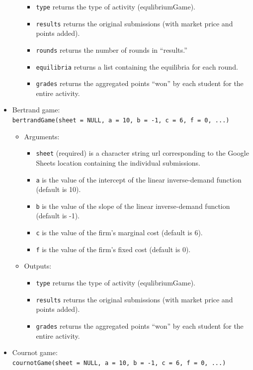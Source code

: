 \documentclass[
]{article}
\providecommand{\tightlist}{%
  \setlength{\itemsep}{0pt}\setlength{\parskip}{0pt}}
\begin{document}
\begin{itemize}
\begin{itemize}
    \begin{itemize}
    \tightlist
    \item
      \texttt{type} returns the type of activity (equlibriumGame).
    \item
      \texttt{results} returns the original submissions (with market
      price and points added).
    \item
      \texttt{rounds} returns the number of rounds in ``results.''
    \item
      \texttt{equilibria} returns a list containing the equilibria for
      each round.
    \item
      \texttt{grades} returns the aggregated points ``won'' by each
      student for the entire activity.
    \end{itemize}
  \end{itemize}
\item
  Bertrand game:
  \texttt{bertrandGame(sheet\ =\ NULL,\ a\ =\ 10,\ b\ =\ -1,\ c\ =\ 6,\ f\ =\ 0,\ ...)}

  \begin{itemize}
  \item
    Arguments:

    \begin{itemize}
    \tightlist
    \item
      \texttt{sheet} (required) is a character string url corresponding
      to the Google Sheets location containing the individual
      submissions.
    \item
      \texttt{a} is the value of the intercept of the linear
      inverse-demand function (default is 10).
    \item
      \texttt{b} is the value of the slope of the linear inverse-demand
      function (default is -1).
    \item
      \texttt{c} is the value of the firm's marginal cost (default is
      6).
    \item
      \texttt{f} is the value of the firm's fixed cost (default is 0).
    \end{itemize}
  \item
    Outputs:

    \begin{itemize}
    \tightlist
    \item
      \texttt{type} returns the type of activity (equlibriumGame).
    \item
      \texttt{results} returns the original submissions (with market
      price and points added).
    \item
      \texttt{grades} returns the aggregated points ``won'' by each
      student for the entire activity.
    \end{itemize}
  \end{itemize}
\item
  Cournot game:
  \texttt{cournotGame(sheet\ =\ NULL,\ a\ =\ 10,\ b\ =\ -1,\ c\ =\ 6,\ f\ =\ 0,\ ...)}


\end{itemize}
\end{document}

